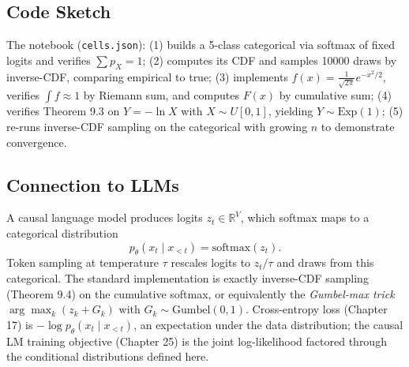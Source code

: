 \subsection*{Code Sketch}

The notebook (\texttt{cells.json}): (1) builds a 5-class categorical via softmax of fixed logits and verifies $\sum p_X = 1$; (2) computes its CDF and samples 10000 draws by inverse-CDF, comparing empirical to true; (3) implements $f(x) = \tfrac{1}{\sqrt{2\pi}} e^{-x^2/2}$, verifies $\int f \approx 1$ by Riemann sum, and computes $F(x)$ by cumulative sum; (4) verifies Theorem 9.3 on $Y = -\ln X$ with $X \sim U[0,1]$, yielding $Y \sim \mathrm{Exp}(1)$; (5) re-runs inverse-CDF sampling on the categorical with growing $n$ to demonstrate convergence.

\subsection*{Connection to LLMs}

A causal language model produces logits $z_t \in \mathbb{R}^V$, which softmax maps to a categorical distribution
\[
p_\theta(x_t \mid x_{<t}) = \mathrm{softmax}(z_t).
\]
Token sampling at temperature $\tau$ rescales logits to $z_t/\tau$ and draws from this categorical. The standard implementation is exactly inverse-CDF sampling (Theorem 9.4) on the cumulative softmax, or equivalently the \emph{Gumbel-max trick} $\arg\max_k(z_k + G_k)$ with $G_k \sim \mathrm{Gumbel}(0,1)$. Cross-entropy loss (Chapter 17) is $-\log p_\theta(x_t\mid x_{<t})$, an expectation under the data distribution; the causal LM training objective (Chapter 25) is the joint log-likelihood factored through the conditional distributions defined here.
